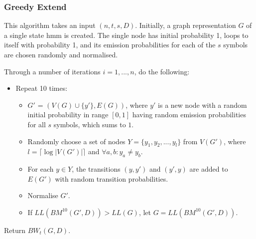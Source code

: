 \subsubsection{Greedy Extend}
This algorithm takes an input $(n, t, s, D)$.
Initially, a graph representation $G$ of a single state \gls{hmm} is created. The single node has initial probability 1, loops to itself with probability 1, and its emission probabilities for each of the $s$ symbols are chosen randomly and normalised.

Through a number of iterations $i = 1, ..., n$, do the following:
\begin{itemize}
\item Repeat 10 times:
	\begin{itemize}
	\item $G'$ = $(V(G) \cup \{y'\}, E(G))$, where $y'$ is a new node with a random initial probability in range $[0, 1]$ having random emission probabilities for all $s$ symbols, which sums to $1$.
	\item Randomly choose a set of nodes $Y = \{y_1, y_2, ... , y_l\}$ from $V(G')$, where $l = \lceil \log |V(G')| \rceil$ and $\forall a,b: y_a \neq y_b$.
	\item For each $y \in Y$, the transitions $(y, y')$ and $(y', y)$ are added to $E(G')$ with random transition probabilities.
	\item Normalise $G'$.
	\item If $LL(BM^{10}(G', D)) > LL(G)$, let $G =LL(BM^{10}(G', D))$.
	\end{itemize}
\end{itemize}

Return $BW_t(G, D)$.